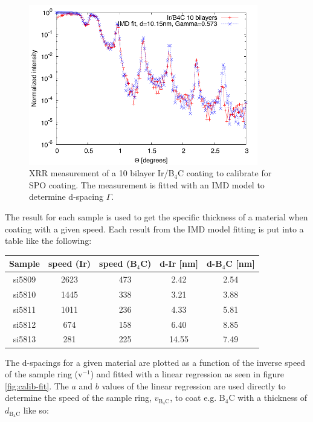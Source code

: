 \begin{figure}[!h]
  \center
  \includegraphics[height=7cm]{figures/chamber/si5811-fit.pdf}
\caption{\footnotesize XRR measurement of a 10 bilayer Ir/B$_4$C coating to calibrate for SPO coating. The measurement is fitted with an IMD model to determine d-spacing $\Gamma$.}\label{fig:irb4c-fit}
\end{figure}

The result for each sample is used to get the specific thickness of a material when coating with a given speed. Each result from the IMD model fitting is put into a table like the following:

\begin{center}
\begin{tabular}{c|c|c|c|c}
Sample & speed (Ir) & speed (B$_4$C) & d-Ir [nm] & d-B$_4$C [nm] \\
\hline
si5809 & 2623 & 473 & 2.42 & 2.54 \\
si5810 & 1445 & 338 & 3.21 & 3.88 \\
si5811 & 1011 & 236 & 4.33 & 5.81 \\
si5812 &  674 & 158 & 6.40 & 8.85 \\
si5813 & 281 & 225 & 14.55 & 7.49
\end{tabular}
\end{center}

The d-spacings for a given material are plotted as a function of the inverse speed of the sample ring (v$^{-1}$) and fitted with a linear regression as seen in figure \ref{fig:calib-fit}. The $a$ and $b$ values of the linear regression are used directly to determine the speed of the sample ring, $v_{\mathrm{B}_4\mathrm{C}}$, to coat e.g. B$_4$C with a thickness of $d_{\mathrm{B}_4\mathrm{C}}$ like so:

